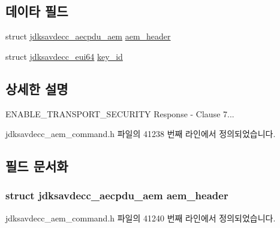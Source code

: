 \subsection*{데이타 필드}
\begin{DoxyCompactItemize}
\item 
struct \hyperlink{structjdksavdecc__aecpdu__aem}{jdksavdecc\+\_\+aecpdu\+\_\+aem} \hyperlink{structjdksavdecc__aem__command__enable__transport__security__response_ae1e77ccb75ff5021ad923221eab38294}{aem\+\_\+header}
\item 
struct \hyperlink{structjdksavdecc__eui64}{jdksavdecc\+\_\+eui64} \hyperlink{structjdksavdecc__aem__command__enable__transport__security__response_a37cbdf6056556ccfaee3ab01dc7c3032}{key\+\_\+id}
\end{DoxyCompactItemize}


\subsection{상세한 설명}
E\+N\+A\+B\+L\+E\+\_\+\+T\+R\+A\+N\+S\+P\+O\+R\+T\+\_\+\+S\+E\+C\+U\+R\+I\+TY Response -\/ Clause 7... 

jdksavdecc\+\_\+aem\+\_\+command.\+h 파일의 41238 번째 라인에서 정의되었습니다.



\subsection{필드 문서화}
\subsubsection[{\texorpdfstring{aem\+\_\+header}{aem_header}}]{\setlength{\rightskip}{0pt plus 5cm}struct {\bf jdksavdecc\+\_\+aecpdu\+\_\+aem} aem\+\_\+header}\hypertarget{structjdksavdecc__aem__command__enable__transport__security__response_ae1e77ccb75ff5021ad923221eab38294}{}\label{structjdksavdecc__aem__command__enable__transport__security__response_ae1e77ccb75ff5021ad923221eab38294}


jdksavdecc\+\_\+aem\+\_\+command.\+h 파일의 41240 번째 라인에서 정의되었습니다.

